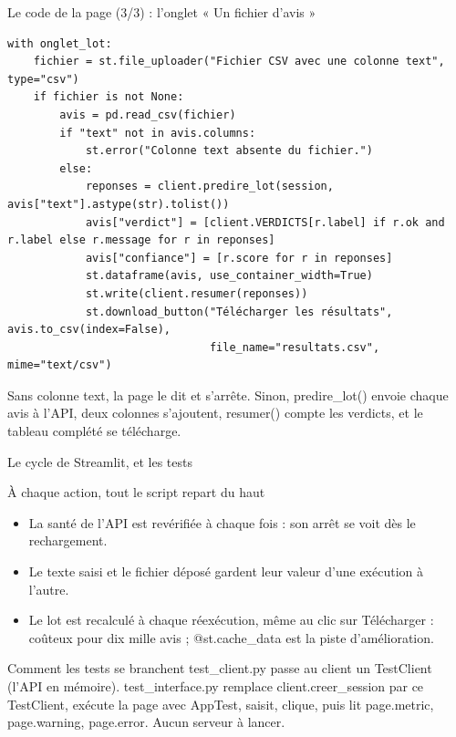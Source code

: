 \documentclass[aspectratio=169,11pt]{beamer}
\newcommand{\co}[1]{{\ttfamily\hyphenchar\font=45\relax #1}}
\begin{document}
\begin{frame}[fragile]{Le code de la page (3/3) : l'onglet « Un fichier d'avis »}
\begin{lstlisting}[basicstyle=\ttfamily\tiny]
with onglet_lot:
    fichier = st.file_uploader("Fichier CSV avec une colonne text", type="csv")
    if fichier is not None:
        avis = pd.read_csv(fichier)
        if "text" not in avis.columns:
            st.error("Colonne text absente du fichier.")
        else:
            reponses = client.predire_lot(session, avis["text"].astype(str).tolist())
            avis["verdict"] = [client.VERDICTS[r.label] if r.ok and r.label else r.message for r in reponses]
            avis["confiance"] = [r.score for r in reponses]
            st.dataframe(avis, use_container_width=True)
            st.write(client.resumer(reponses))
            st.download_button("Télécharger les résultats", avis.to_csv(index=False),
                               file_name="resultats.csv", mime="text/csv")
\end{lstlisting}
\small Sans colonne \co{text}, la page le dit et s'arrête. Sinon, \co{predire\_lot()} envoie chaque avis à
l'API, deux colonnes s'ajoutent, \co{resumer()} compte les verdicts, et le tableau complété se télécharge.
\end{frame}

\begin{frame}{Le cycle de Streamlit, et les tests}
\begin{block}{À chaque action, tout le script repart du haut}
\begin{itemize}\small
\item La santé de l'API est revérifiée à chaque fois : son arrêt se voit dès le rechargement.
\item Le texte saisi et le fichier déposé gardent leur valeur d'une exécution à l'autre.
\item Le lot est recalculé à chaque réexécution, même au clic sur \og Télécharger \fg{} : coûteux pour dix mille
avis ; \co{@st.cache\_data} est la piste d'amélioration.
\end{itemize}
\end{block}
\begin{block}{Comment les tests se branchent}
\small \co{test\_client.py} passe au client un \co{TestClient} (l'API en mémoire). \co{test\_interface.py}
remplace \co{client.creer\_session} par ce \co{TestClient}, exécute la page avec \co{AppTest}, saisit, clique,
puis lit \co{page.metric}, \co{page.warning}, \co{page.error}. Aucun serveur à lancer.
\end{block}
\end{frame}
\end{document}
